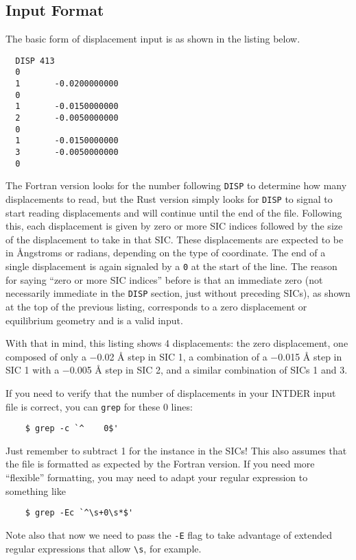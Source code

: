 \documentclass{article}
\begin{document}
\subsection{Input Format}
\label{sec:disp-inp}

The basic form of displacement input is as shown in the listing below.

\begin{lstlisting}
  DISP 413
  0
  1       -0.0200000000
  0
  1       -0.0150000000
  2       -0.0050000000
  0
  1       -0.0150000000
  3       -0.0050000000
  0
\end{lstlisting}

The Fortran version looks for the number following \verb|DISP| to determine how
many displacements to read, but the Rust version simply looks for \verb|DISP| to
signal to start reading displacements and will continue until the end of the
file. Following this, each displacement is given by zero or more SIC indices
followed by the size of the displacement to take in that SIC. These
displacements are expected to be in \AA{}ngstroms or radians, depending on the
type of coordinate. The end of a single displacement is again signaled by a
\verb|0| at the start of the line. The reason for saying ``zero or more SIC
indices'' before is that an immediate zero (not necessarily immediate in the
\verb|DISP| section, just without preceding SICs), as shown at the top of the
previous listing, corresponds to a zero displacement or equilibrium geometry and
is a valid input.

With that in mind, this listing shows 4 displacements: the zero displacement,
one composed of only a $-$0.02 \AA{} step in SIC 1, a combination of a $-$0.015
\AA{} step in SIC 1 with a $-$0.005 \AA{} step in SIC 2, and a similar
combination of SICs 1 and 3.

\begin{tcolorbox}[title=Tip]
  If you need to verify that the number of displacements in your INTDER input
  file is correct, you can \verb|grep| for these 0 lines:

  \begin{lstlisting}
    $ grep -c `^    0$'
  \end{lstlisting}

  Just remember to subtract 1 for the instance in the SICs! This also assumes
  that the file is formatted as expected by the Fortran version. If you need
  more ``flexible'' formatting, you may need to adapt your regular expression to
  something like

  \begin{lstlisting}
    $ grep -Ec `^\s+0\s*$'
  \end{lstlisting}

  Note also that now we need to pass the \verb|-E| flag to take advantage of
  extended regular expressions that allow \verb|\s|, for example.
\end{tcolorbox}
\end{document}
